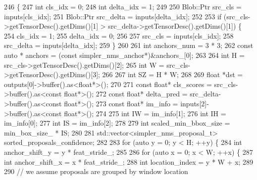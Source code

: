\begin{DoxyCode}
246                                                              \{
247         \textcolor{keywordtype}{int} cls\_idx = 0;
248         \textcolor{keywordtype}{int} delta\_idx = 1;
249 
250         Blob::Ptr src\_cls = inputs[cls\_idx];
251         Blob::Ptr src\_delta = inputs[delta\_idx];
252 
253         \textcolor{keywordflow}{if} (src\_cls->getTensorDesc().getDims()[1] > src\_delta->getTensorDesc().getDims()[1]) \{
254             cls\_idx = 1;
255             delta\_idx = 0;
256 
257             src\_cls = inputs[cls\_idx];
258             src\_delta = inputs[delta\_idx];
259         \}
260 
261         \textcolor{keywordtype}{int} anchors\_num = 3 * 3;
262         \textcolor{keyword}{const} \textcolor{keyword}{auto} * anchors = (\textcolor{keyword}{const} simpler\_nms\_anchor*)&anchors\_[0];
263 
264         \textcolor{keywordtype}{int} H = src\_cls->getTensorDesc().getDims()[2];
265         \textcolor{keywordtype}{int} W = src\_cls->getTensorDesc().getDims()[3];
266 
267         \textcolor{keywordtype}{int} SZ = H * W;
268 
269         \textcolor{keywordtype}{float} *dst = outputs[0]->buffer().as<\textcolor{keywordtype}{float}*>();
270 
271         \textcolor{keyword}{const} \textcolor{keywordtype}{float}* cls\_scores = src\_cls->buffer().as<\textcolor{keyword}{const} \textcolor{keywordtype}{float}*>();
272         \textcolor{keyword}{const} \textcolor{keywordtype}{float}* delta\_pred = src\_delta->buffer().as<\textcolor{keyword}{const} \textcolor{keywordtype}{float}*>();
273         \textcolor{keyword}{const} \textcolor{keywordtype}{float}* im\_info = inputs[2]->buffer().as<\textcolor{keyword}{const} \textcolor{keywordtype}{float}*>();
274 
275         \textcolor{keywordtype}{int} IW = im\_info[1];
276         \textcolor{keywordtype}{int} IH = im\_info[0];
277         \textcolor{keywordtype}{int} IS = im\_info[2];
278 
279         \textcolor{keywordtype}{int} scaled\_min\_bbox\_size = min\_box\_size\_ * IS;
280 
281         std::vector<simpler\_nms\_proposal\_t> sorted\_proposals\_confidence;
282 
283         \textcolor{keywordflow}{for} (\textcolor{keyword}{auto} y = 0; y < H; ++y) \{
284             \textcolor{keywordtype}{int} anchor\_shift\_y = y * feat\_stride\_;
285 
286             \textcolor{keywordflow}{for} (\textcolor{keyword}{auto} x = 0; x < W; ++x) \{
287                 \textcolor{keywordtype}{int} anchor\_shift\_x = x * feat\_stride\_;
288                 \textcolor{keywordtype}{int} location\_index = y * W + x;
289 
290                 \textcolor{comment}{// we assume proposals are grouped by window location}

\end{DoxyCode}
